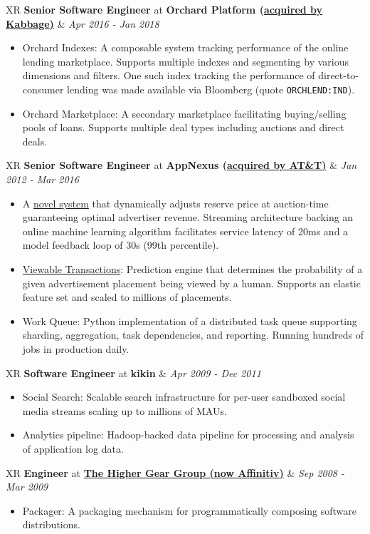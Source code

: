 \documentclass[9pt,twoside,letterpaper,hidelinks]{article}
\newcommand{\resumeItem}[2]{
  \item{
    {#1}{: #2 }
  }
}
\newcommand{\resumeSubheading}[4]{
        \newcolumntype{R}{>{\raggedleft\arraybackslash}X}%
    \begin{tabularx}{\textwidth}{XR}
      \textbf{#3} at \textbf{#1} & \textit{\small #4}
    \end{tabularx}
}
\newcommand{\resumeItemListStart}{
  \begin{itemize}[noitemsep,topsep=0pt]
}
\newcommand{\resumeItemListEnd}{
  \end{itemize}
}
\begin{document}
    \resumeSubheading
      {Orchard Platform (\href{https://newsroom.kabbage.com/news/company/kabbage-to-acquire-orchard-to-enhance-data-science-platform/}{acquired by Kabbage)}}{New York, NY} {Senior Software Engineer}{Apr 2016 - Jan 2018}
      \resumeItemListStart
        \resumeItem{Orchard Indexes}
          {A composable system tracking performance of the online lending marketplace.  Supports multiple indexes and segmenting by various dimensions and filters.  One such index tracking the performance of direct-to-consumer lending was made available via Bloomberg (quote \texttt{ORCHLEND:IND}).}
        \resumeItem{Orchard Marketplace}
          {A secondary marketplace facilitating buying/selling pools of loans. Supports multiple deal types including auctions and direct deals.}
      \resumeItemListEnd

    \resumeSubheading
      {AppNexus (\href{https://about.att.com/story/att_to_acquire_appnexus.html}{acquired by AT\&T)}}{New York, NY} {Senior Software Engineer}{Jan 2012 - Mar 2016}
      \resumeItemListStart
        \item{A {\href{https://patents.google.com/patent/US20160275570A1/en}{novel system}} that dynamically adjusts reserve price at auction-time guaranteeing optimal advertiser revenue. Streaming architecture backing an online machine learning algorithm facilitates service latency of 20ms and a model feedback loop of 30s (99th percentile).}
        \resumeItem{\href{https://wiki.xandr.com/display/industry/Introduction+to+Viewability}{Viewable Transactions}}
          {Prediction engine that determines the probability of a given advertisement placement being viewed by a human. Supports an elastic feature set and scaled to millions of placements.}
        \resumeItem{Work Queue}
          {Python implementation of a distributed task queue supporting sharding, aggregation, task dependencies, and reporting. Running hundreds of jobs in production daily.}
          \resumeItemListEnd

    \resumeSubheading
      {kikin}{New York, NY}{Software Engineer}{Apr 2009 - Dec 2011}
      \resumeItemListStart
        \resumeItem{Social Search}
          {Scalable search infrastructure for per-user sandboxed social media streams scaling up to millions of MAUs.}
        \resumeItem{Analytics pipeline}
          {Hadoop-backed data pipeline for processing and analysis of application log data.}
      \resumeItemListEnd

    \resumeSubheading
      {\href{http://highergear.com}{The Higher Gear Group (now Affinitiv)}}{New York, NY}{Engineer}{Sep 2008 - Mar 2009}
      \resumeItemListStart
        \resumeItem{Packager}
          {A packaging mechanism for programmatically composing software distributions.}
      \resumeItemListEnd
\end{document}
